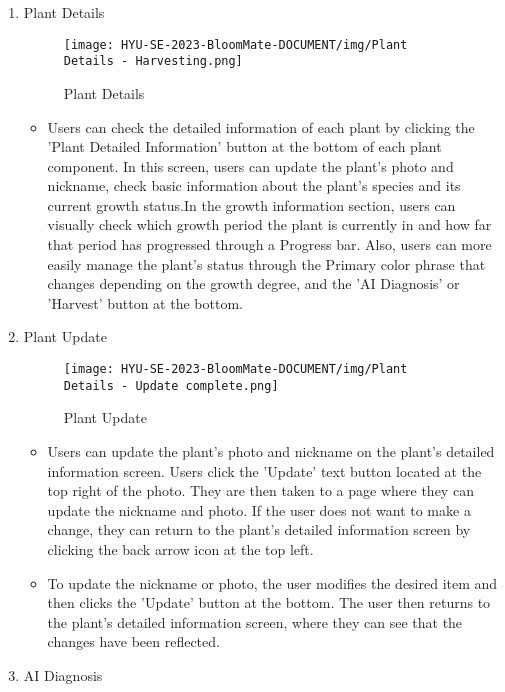 \documentclass[conference, a4paper]{IEEEtran}
\begin{document}
\begin{enumerate}
    \newpage
    
    \item Plant Details
        \begin{figure}[h]
        \centering
        \texttt{[image: HYU-SE-2023-BloomMate-DOCUMENT/img/Plant Details - Harvesting.png]}
        \caption{Plant Details}
        \label{fig:Plant Details}
        \end{figure}
    \begin{itemize}
        \item Users can check the detailed information of each plant by clicking the 'Plant Detailed Information' button at the bottom of each plant component. In this screen, users can update the plant's photo and nickname, check basic information about the plant's species and its current growth status.In the growth information section, users can visually check which growth period the plant is currently in and how far that period has progressed through a Progress bar. Also, users can more easily manage the plant's status through the Primary color phrase that changes depending on the growth degree, and the 'AI Diagnosis' or 'Harvest' button at the bottom.
    \end{itemize}
    \newpage
    \item  Plant Update        
        \begin{figure}[h]
        \centering
        \texttt{[image: HYU-SE-2023-BloomMate-DOCUMENT/img/Plant Details - Update complete.png]}
        \caption{Plant Update}
        \label{fig:Plant Update}
        \end{figure}
    \begin{itemize}
        \item Users can update the plant's photo and nickname on the plant's detailed information screen. Users click the 'Update' text button located at the top right of the photo. They are then taken to a page where they can update the nickname and photo. If the user does not want to make a change, they can return to the plant's detailed information screen by clicking the back arrow icon at the top left.
        \item To update the nickname or photo, the user modifies the desired item and then clicks the 'Update' button at the bottom. The user then returns to the plant's detailed information screen, where they can see that the changes have been reflected.
    \end{itemize}
    \item AI Diagnosis

\end{enumerate}
\end{document}
